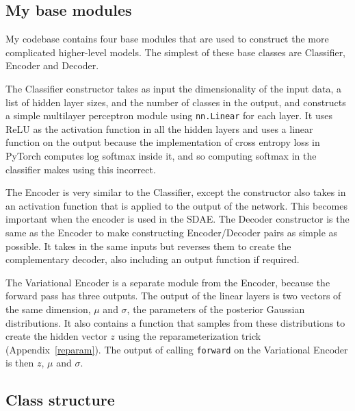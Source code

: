 \subsection{My base modules}
My codebase contains four base modules that are used to construct the more complicated higher-level models. The simplest of 
these base classes are Classifier, Encoder and Decoder.

The Classifier constructor takes as input the dimensionality of the input data, a list of hidden layer sizes, and the number of classes 
in the output, and constructs a simple multilayer perceptron module using \texttt{nn.Linear} for each layer. It uses ReLU as the activation 
function in all the hidden layers and uses a linear function on the output because the implementation of 
cross entropy loss in PyTorch computes log softmax inside it, and so computing softmax in the classifier makes using this incorrect.

The Encoder is very similar to the Classifier, except the constructor also takes in an activation function that is applied to the output 
of the network. This becomes important when the encoder is used in the SDAE. The Decoder constructor is the same as the Encoder to make 
constructing Encoder/Decoder pairs as simple as possible. It takes in the same inputs but reverses them to create the complementary decoder,
also including an output function if required.

The Variational Encoder is a separate module from the Encoder, because the forward pass has three outputs. 
The output of the linear layers is two vectors of the same dimension, $\mu$ and $\sigma$, the parameters of the posterior Gaussian distributions.
It also contains a function that samples from these distributions to create the hidden vector $z$ using the reparameterization trick 
(Appendix~\ref{reparam}). The output of calling \texttt{forward} on the Variational Encoder is then $z$, $\mu$ and $\sigma$.

\subsection{Class structure}

